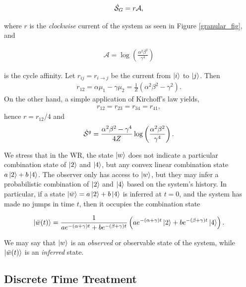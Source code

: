 \begin{align}
\dot{\mathcal{S}}_G = r\mathcal{A},
\end{align}

where $r$ is the \textit{clockwise} current of the system as seen in Figure \ref{granular_fig}, and 

\begin{align}
\mathcal{A} = \log\left (\frac{\alpha^2\beta^2}{\gamma^4}\right)
\end{align}

is the cycle affinity. Let $r_{ij} = r_{i \rightarrow j}$ be the current from $\ket{i}$ to $\ket{j}$. Then 
\begin{align}
r_{12} = \alpha \mu_1 - \gamma \mu_2 = \frac{1}{Z}(\alpha^2\beta^2-\gamma^2).
\end{align}
On the other hand, a simple application of Kirchoff's law yields, 
\begin{align}
r_{12} = r_{23} = r_{34} = r_{41},
\end{align}
hence $r = r_{12}/4$ and 
\begin{align}\label{granular-waiting-entropy-close}
\dot{\mathcal{S}}^g = \frac{\alpha^2\beta^2-\gamma^4}{4Z}\log\left(\frac{\alpha^2\beta^2}{\gamma^4} \right).
\end{align}

We stress that in the WR, the state $\ket{w}$ does not indicate a particular combination state of $\ket{2}$ and $\ket{4}$, but any convex linear combination state $a\ket{2} + b\ket{4}$. The observer only has access to $\ket{w}$, but they may infer a probabilistic combination of $\ket{2}$ and $\ket{4}$ based on the system's history. In particular, if a state $\ket{\bar{w}} = a\ket{2} + b\ket{4}$ is inferred at $t = 0$, and the system has made no jumps in time $t$, then it occupies the combination state 

\begin{align}\label{waiting-room-timeevol}
\ket{\bar{w}(t)} = \frac{1}{a e^{-(\alpha + \gamma)t} + b e^{-(\beta + \gamma)t}}\left (a e^{-(\alpha + \gamma)t}\ket{2} + b e^{-(\beta + \gamma)t}  \ket{4}\right).
\end{align}

We may say that $\ket{w}$ is an \emph{observed} or observable state of the system, while $\ket{\bar{w}(t)}$ is an \emph{inferred} state.  

\subsection{Discrete Time Treatment}
